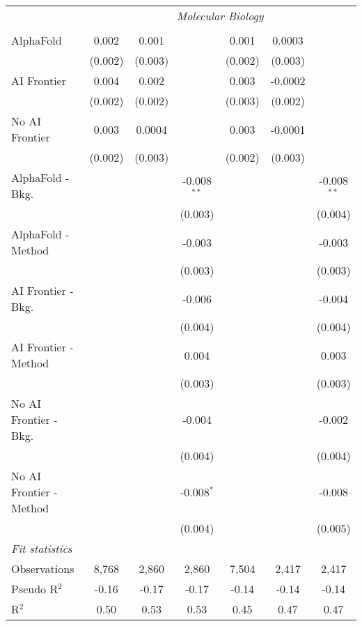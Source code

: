 \begin{tabular}{lcccccc}
 & \multicolumn{6}{c}{\textit{Molecular Biology}} \\ \\
   AlphaFold               & 0.002   & 0.001   &               & 0.001   & 0.0003  &   \\   
                           & (0.002) & (0.003) &               & (0.002) & (0.003) &   \\   
   AI Frontier             & 0.004   & 0.002   &               & 0.003   & -0.0002 &   \\   
                           & (0.002) & (0.002) &               & (0.003) & (0.002) &   \\   
   No AI Frontier          & 0.003   & 0.0004  &               & 0.003   & -0.0001 &   \\   
                           & (0.002) & (0.003) &               & (0.002) & (0.003) &   \\   
   AlphaFold - Bkg.        &         &         & -0.008$^{**}$ &         &         & -0.008$^{**}$\\   
                           &         &         & (0.003)       &         &         & (0.004)\\   
   AlphaFold - Method      &         &         & -0.003        &         &         & -0.003\\   
                           &         &         & (0.003)       &         &         & (0.003)\\   
   AI Frontier - Bkg.      &         &         & -0.006        &         &         & -0.004\\   
                           &         &         & (0.004)       &         &         & (0.004)\\   
   AI Frontier - Method    &         &         & 0.004         &         &         & 0.003\\   
                           &         &         & (0.003)       &         &         & (0.003)\\   
   No AI Frontier - Bkg.   &         &         & -0.004        &         &         & -0.002\\   
                           &         &         & (0.004)       &         &         & (0.004)\\   
   No AI Frontier - Method &         &         & -0.008$^{*}$  &         &         & -0.008\\   
                           &         &         & (0.004)       &         &         & (0.005)\\   
   \midrule
   \emph{Fit statistics}\\
   Observations            & 8,768   & 2,860   & 2,860         & 7,504   & 2,417   & 2,417\\  
   Pseudo R$^2$            & -0.16   & -0.17   & -0.17         & -0.14   & -0.14   & -0.14\\  
   R$^2$                   & 0.50    & 0.53    & 0.53          & 0.45    & 0.47    & 0.47\\  
   

\end{tabular}

